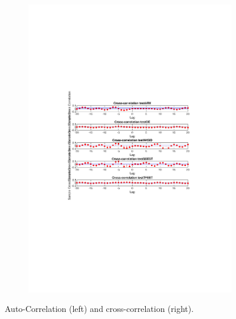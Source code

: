 \documentclass[]{article}
\begin{document}
\begin{figure}[ht]
\begin{subfigure}{.49\textwidth}
	\includegraphics[trim= 10cm 8cm 10cm 8cm, scale=0.4]{figures/cross-corr-1step.pdf}
\end{subfigure}
\caption{Auto-Correlation (left) and cross-correlation (right).}
\label{fig:correlations}
\end{figure}
\end{document}
